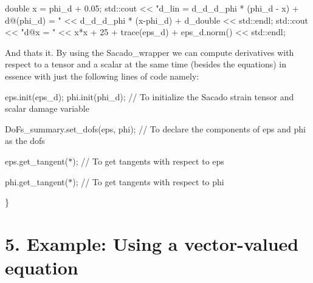\begin{DoxyCode}
\textcolor{keywordtype}{double} x = phi\_d + 0.05;
std::cout << \textcolor{stringliteral}{"d\_lin = d\_d\_d\_phi * (phi\_d - x) + d@(phi\_d) = "} << d\_d\_d\_phi * (x-phi\_d) + d\_double << 
      std::endl;
std::cout << \textcolor{stringliteral}{"d@x = "} << x*x + 25 + trace(eps\_d) + eps\_d.norm() << std::endl;
\end{DoxyCode}
 And that\textquotesingle{}s it. By using the Sacado\+\_\+wrapper we can compute derivatives with respect to a tensor and a scalar at the same time (besides the equations) in essence with just the following lines of code namely\+:
\begin{DoxyItemize}
\item eps.\+init(eps\+\_\+d); phi.\+init(phi\+\_\+d); // To initialize the Sacado strain tensor and scalar damage variable
\item Do\+Fs\+\_\+summary.\+set\+\_\+dofs(eps, phi); // To declare the components of eps and phi as the dofs
\item eps.\+get\+\_\+tangent($\ast$); // To get tangents with respect to eps
\item phi.\+get\+\_\+tangent($\ast$); // To get tangents with respect to phi 
\begin{DoxyCode}
\}
\end{DoxyCode}
 
\end{DoxyItemize}\hypertarget{index_Ex5}{}\section{5. Example\+: Using a vector-\/valued equation}\label{index_Ex5}

